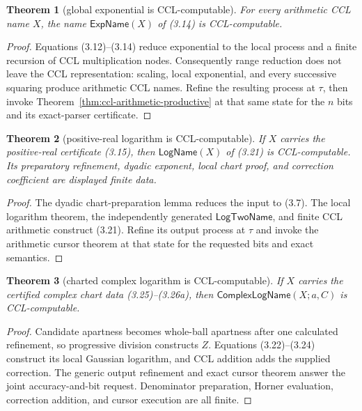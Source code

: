 \documentclass[10pt]{article}
\newtheorem{theorem}{Theorem}[section]
\theoremstyle{definition}
\theoremstyle{remark}
\begin{document}
\begin{theorem}[global exponential is CCL-computable]
For every arithmetic CCL name $X$, the name $\mathsf{ExpName}(X)$ of (3.14)
is CCL-computable.
\end{theorem}

\begin{proof}
Equations (3.12)--(3.14) reduce exponential to the local process and a
finite recursion of CCL multiplication nodes.  Consequently range reduction
does not leave the CCL representation: scaling, local exponential, and every
successive squaring produce arithmetic CCL names.  Refine the resulting
process at $\tau$, then invoke Theorem~\ref{thm:ccl-arithmetic-productive} at
that same state for the $n$ bits and its exact-parser certificate.
\end{proof}

\begin{theorem}[positive-real logarithm is CCL-computable]
If $X$ carries the positive-real certificate (3.15), then
$\mathsf{LogName}(X)$ of (3.21) is CCL-computable.  Its preparatory
refinement, dyadic exponent, local chart proof, and correction coefficient
are displayed finite data.
\end{theorem}

\begin{proof}
The dyadic chart-preparation lemma reduces the input to (3.7).  The local
logarithm theorem, the independently generated $\mathsf{LogTwoName}$, and
finite CCL arithmetic construct (3.21).  Refine its output process at
$\tau$ and invoke the arithmetic cursor theorem at that state for the
requested bits and exact semantics.
\end{proof}

\begin{theorem}[charted complex logarithm is CCL-computable]
If $X$ carries the certified complex chart data (3.25)--(3.26a), then
$\mathsf{ComplexLogName}(X;a,C)$ is CCL-computable.
\end{theorem}

\begin{proof}
Candidate apartness becomes whole-ball apartness after one calculated
refinement, so progressive division constructs $Z$.  Equations
(3.22)--(3.24) construct its local Gaussian logarithm, and CCL addition adds
the supplied correction.  The generic output refinement and exact cursor
theorem answer the joint accuracy-and-bit request.  Denominator preparation,
Horner evaluation, correction addition, and cursor execution are all finite.
\end{proof}
\end{document}
